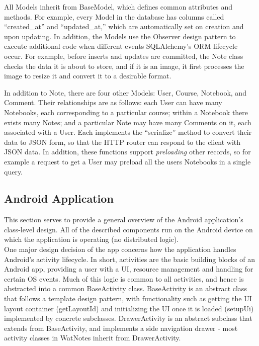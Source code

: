 \documentclass[12pt]{article}
\begin{document}
    All Models inherit from BaseModel, which defines common attributes and
    methods. For example, every Model in the database has columns called
    ``created\_at'' and ``updated\_at,'' which are automatically set on creation
    and upon updating. In addition, the Models use the Observer design pattern
    to execute additional code when different events SQLAlchemy's ORM lifecycle
    occur. For example, before inserts and updates are committed, the Note class
    checks the data it is about to store, and if it is an image, it first
    processes the image to resize it and convert it to a desirable format.

    In addition to Note, there are four other Models: User, Course, Notebook,
    and Comment. Their relationships are as follows: each User can have many
    Notebooks, each corresponding to a particular course; within a Notebook
    there exists many Notes; and a particular Note may have many Comments on it,
    each associated with a User. Each implements the ``serialize'' method to
    convert their data to JSON form, so that the HTTP router can respond to the
    client with JSON data. In addition, these functions support
    \emph{preloading} other records, so for example a request to get a User may
    preload all the users Notebooks in a single query.

  \subsection{Android Application}
    This section serves to provide a general overview of the Android application's class-level design. All of the described components run on the Android
    device on which the application is operating (no distributed logic). \\

    One major design decision of the app concerns how the application handles Android's activity lifecycle. In short, activities are the basic building blocks of
    an Android app, providing a user with a UI, resource management and handling for certain OS events. Much of this logic is common to all activities, and
    hence is abstracted into a common BaseActivity class. BaseActivity is an abstract class that follows a template design pattern, with functionality
    such as getting the UI layout container (getLayoutId) and initializing the UI once it is loaded (setupUi) implemented by concrete subclasses. DrawerActivity
    is an abstract subclass that extends from BaseActivity, and implements a side navigation drawer - most activity classes in WatNotes inherit from DrawerActivity. \\
\end{document}
